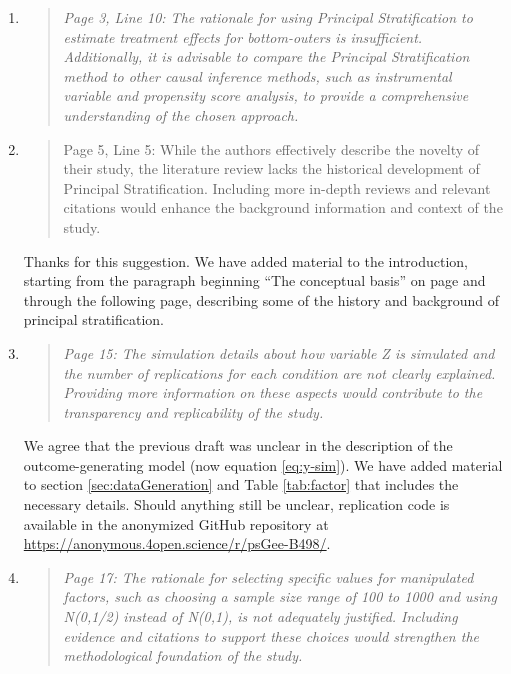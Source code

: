 \documentclass[]{article}
\newenvironment{itquote}
  {\begin{quote} \itshape}
  {\end{quote}\ignorespacesafterend}
\begin{document}
\begin{enumerate}
 
\item    \begin{itquote}  Page 3, Line 10: The rationale for using Principal Stratification to estimate treatment effects for bottom-outers is insufficient. Additionally, it is advisable to compare the Principal Stratification method to other causal inference methods, such as instrumental variable and propensity score analysis, to provide a comprehensive understanding of the chosen approach.
\end{itquote}



\item \begin{itquote}
    
     Page 5, Line 5: While the authors effectively describe the novelty of their study, the literature review lacks the historical development of Principal Stratification. Including more in-depth reviews and relevant citations would enhance the background information and context of the study.
\end{itquote}

Thanks for this suggestion. We have added material to the introduction, starting from the paragraph beginning ``The conceptual basis'' on page \pageref{background} and through the following page, describing some of the history and background of principal stratification. 

\item \begin{itquote}
     Page 15: The simulation details about how variable Z is simulated and the number of replications for each condition are not clearly explained. Providing more information on these aspects would contribute to the transparency and replicability of the study.
\end{itquote}
We agree that the previous draft was unclear in the description of the outcome-generating model (now equation \ref{eq:y-sim}). We have added material to section \ref{sec:dataGeneration} and Table \ref{tab:factor} that includes the necessary details. Should anything still be unclear, replication code is available in the anonymized GitHub repository at \url{https://anonymous.4open.science/r/psGee-B498/}.


\item \begin{itquote}     Page 17: The rationale for selecting specific values for manipulated factors, such as choosing a sample size range of 100 to 1000 and using N(0,1/2) instead of N(0,1), is not adequately justified. Including evidence and citations to support these choices would strengthen the methodological foundation of the study.


\end{itquote}
\end{enumerate}
\end{document}
